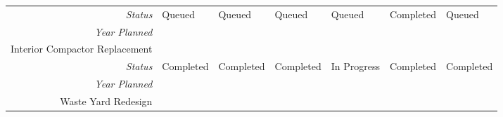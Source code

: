 \begin{tabularx}{\textwidth}{r|X|X|X|X|X|X|}
    \multicolumn{1}{|r|}{\cellcolor{ccorangelight}\textit{Status}}                & Queued                                                         & Queued                                                         & Queued                                                         & Queued                                                         & Completed                                                         & Queued                                                         \\
    \multicolumn{1}{|r|}{\cellcolor{ccorangelight}\textit{Year Planned}}                  &                                                      &                                                      &                                                      &                                                      &                                                      &                                                      \\ \hline
\multicolumn{1}{|V{.2\columnwidth}|}{\cellcolor{ccorangelight}Interior Compactor Replacement}          &                                                                  &                                                                  &                                                                  &                                                                  &                                                                  &                                                                  \\
    \multicolumn{1}{|r|}{\cellcolor{ccorangelight}\textit{Status}}                & Completed                                                         & Completed                                                         & Completed                                                         & In Progress                                                         & Completed                                                         & Completed                                                         \\
    \multicolumn{1}{|r|}{\cellcolor{ccorangelight}\textit{Year Planned}}                  &                                                      &                                                      &                                                      &                                                      &                                                      &                                                      \\ \hline
\multicolumn{1}{|V{.2\columnwidth}|}{\cellcolor{ccorangelight}Waste Yard Redesign}          &                                                                  &                                                                  &                                                                  &                                                                  &                                                                  &                                                                  \\

\end{tabularx}
